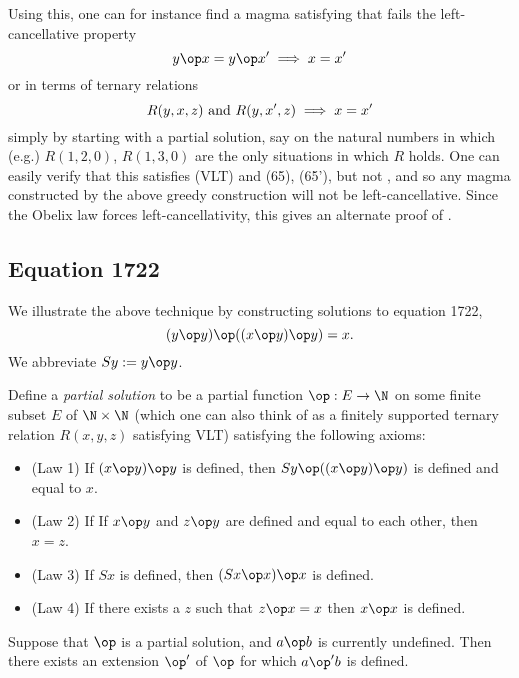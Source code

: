 Using this, one can for instance find a magma satisfying  that fails the left-cancellative property
$$ y \op x = y \op x' \implies x=x'$$
or in terms of ternary relations
\begin{equation}\label{left-inject}
   R(y,x,z) \hbox{ and } R(y,x',z) \implies x=x'
\end{equation}
simply by starting with a partial solution, say on the natural numbers in which (e.g.) $R(1,2,0)$, $R(1,3,0)$ are the only situations in which $R$ holds.  One can easily verify that this satisfies (VLT) and (65), (65'), but not , and so any magma constructed by the above greedy construction will not be left-cancellative.  Since the Obelix law  forces left-cancellativity, this gives an alternate proof of .

\subsection{Equation 1722}

We illustrate the above technique by constructing solutions to equation 1722,
\begin{equation}\label{1722}
  (y \op y) \op ((x \op y) \op y) = x.
\end{equation}
We abbreviate $Sy := y \op y$.

Define a \emph{partial solution} to be a partial function $\op: E \to \N$ on some finite subset $E$ of $\N \times \N$ (which one can also think of as a finitely supported ternary relation $R(x,y,z)$ satisfying VLT) satisfying the following axioms:
\begin{itemize}
\item (Law 1) If $(x \op y) \op y$ is defined, then $Sy \op ((x \op y) \op y)$ is defined and equal to $x$.
\item (Law 2) If  If $x \op y$ and $z \op y$ are defined and equal to each other, then $x=z$.
\item (Law 3) If $Sx$ is defined, then $(Sx \op x) \op x$ is defined.
\item (Law 4) If there exists a $z$ such that $z \op x = x$ then $x \op x$ is defined.
\end{itemize}

\begin{lemma}[1722 extension]\label{1722-extension}\leanok{}  Suppose that $\op$ is a partial solution, and $a \op b$ is currently undefined.  Then there exists an extension $\op'$ of $\op$ for which $a \op' b$ is defined.
\end{lemma}

